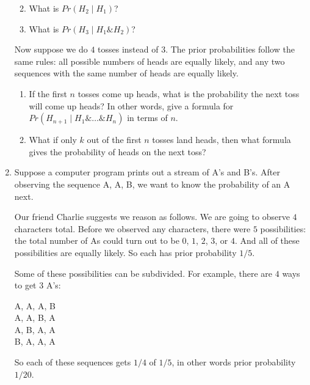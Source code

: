 \documentclass[justified]{tufte-book}
\providecommand{\tightlist}{%
  \setlength{\itemsep}{0pt}\setlength{\parskip}{0pt}}
\newcommand{\given}{\mid}
\renewcommand{\wedge}{\mathbin{\&}}
\newcommand{\p}{Pr}
\begin{document}
\begin{enumerate}
  \begin{enumerate}
  \def\labelenumii{\alph{enumii}.}
  \tightlist
  \item
    What is \(\p(H_2 \given H_1)\)?
  \item
    What is \(\p(H_3 \given H_1 \wedge H_2)\)?
  \end{enumerate}

  Now suppose we do \(4\) tosses instead of \(3\). The prior probabilities follow the same rules: all possible numbers of heads are equally likely, and any two sequences with the same number of heads are equally likely.

  \begin{enumerate}
  \def\labelenumii{\alph{enumii}.}
  \setcounter{enumii}{2}
  \tightlist
  \item
    If the first \(n\) tosses come up heads, what is the probability the next toss will come up heads? In other words, give a formula for \(\p(H_{n+1} \given H_1 \wedge \ldots \wedge H_n)\) in terms of \(n\).
  \item
    What if only \(k\) out of the first \(n\) tosses land heads, then what formula gives the probability of heads on the next toss?
  \end{enumerate}
\item
  Suppose a computer program prints out a stream of A's and B's. After observing the sequence A, A, B, we want to know the probability of an A next.

  Our friend Charlie suggests we reason as follows. We are going to observe \(4\) characters total. Before we observed any characters, there were \(5\) possibilities: the total number of As could turn out to be \(0\), \(1\), \(2\), \(3\), or \(4\). And all of these possibilities are equally likely. So each has prior probability \(1/5\).

  Some of these possibilities can be subdivided. For example, there are \(4\) ways to get \(3\) A's:

  A, A, A, B\\
  A, A, B, A\\
  A, B, A, A\\
  B, A, A, A

  So each of these sequences gets \(1/4\) of \(1/5\), in other words prior probability \(1/20\).


\end{enumerate}
\end{document}
